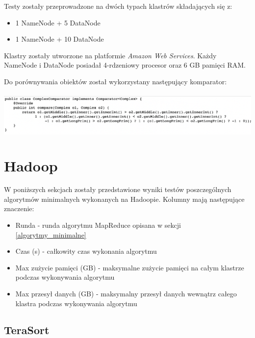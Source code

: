 \documentclass[licencjacka]{pracamgr}
\begin{document}
Testy zostały przeprowadzone na dwóch typach klastrów składających się z:
\begin{itemize}
    \item 1 NameNode + 5 DataNode
    \item 1 NameNode + 10 DataNode
\end{itemize}

Klastry zostały utworzone na platformie \textit{Amazon Web Services}. Każdy NameNode i DataNode posiadał 4-rdzeniowy procesor oraz 6 GB pamięci RAM.

Do porównywania obiektów został wykorzystany następujący komparator:
\\
\\
\includegraphics[width=15cm]{complex_cmp.png}

\section{Hadoop}

W poniższych sekcjach zostały przedstawione wyniki testów poszczególnych algorytmów minimalnych wykonanych na Hadoopie. Kolumny mają następujące znaczenie:
\begin{itemize}
    \item Runda - runda algorytmu MapReduce opisana w sekcji \ref{algorytmy_minimalne}
    \item Czas (s) - całkowity czas wykonania algorytmu
    \item Max zużycie pamięci (GB) - maksymalne zużycie pamięci na całym klastrze podczas wykonywania algorytmu
    \item Max przesył danych (GB) - maksymalny przesył danych wewnątrz całego klastra podczas wykonywania algorytmu
\end{itemize}

\subsection{TeraSort}

\begin{table}[H]
\centering
\caption{Wykonanie algorytmu \textit{TeraSort} na 1 GB danych przy użyciu 5 maszyn.}
\label{tab:my-table}
\end{table}
\end{document}
